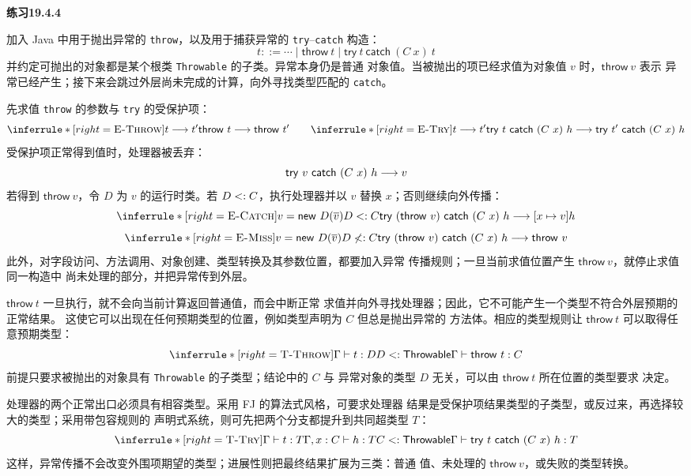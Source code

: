 \begin{taplsolutionentrybox}
\label{sol:translator:19.4.4}
\textbf{练习19.4.4}

加入 Java 中用于抛出异常的 \texttt{throw}，以及用于捕获异常的
\texttt{try}--\texttt{catch} 构造：
\[
 t::=\cdots
 \mid \mathsf{throw}\ t
 \mid \mathsf{try}\ t\ \mathsf{catch}\ (C\ x)\ t
\]
并约定可抛出的对象都是某个根类 \texttt{Throwable} 的子类。异常本身仍是普通
对象值。当被抛出的项已经求值为对象值 \(v\) 时，\(\mathsf{throw}\ v\) 表示
异常已经产生；接下来会跳过外层尚未完成的计算，向外寻找类型匹配的
\texttt{catch}。

先求值 \texttt{throw} 的参数与 \texttt{try} 的受保护项：
\[
\inferrule*[right=\textsc{E-Throw}]
 {t\trans t'}{\mathsf{throw}\ t\trans\mathsf{throw}\ t'}
\qquad
\inferrule*[right=\textsc{E-Try}]
 {t\trans t'}
 {\mathsf{try}\ t\ \mathsf{catch}\ (C\ x)\ h
  \trans
  \mathsf{try}\ t'\ \mathsf{catch}\ (C\ x)\ h}
\]
受保护项正常得到值时，处理器被丢弃：
\[
 \mathsf{try}\ v\ \mathsf{catch}\ (C\ x)\ h\mathrel{\longrightarrow} v
\]
若得到 \(\mathsf{throw}\ v\)，令 \(D\) 为 \(v\) 的运行时类。若
\(D\mathrel{<:} C\)，执行处理器并以 \(v\) 替换 \(x\)；否则继续向外传播：
\[
\inferrule*[right=\textsc{E-Catch}]
 {v=\mathsf{new}\ D(\overline v)\\D\subtype C}
 {\mathsf{try}\ (\mathsf{throw}\ v)\ \mathsf{catch}\ (C\ x)\ h
  \trans[x\mapsto v]h}
\]
\[
\inferrule*[right=\textsc{E-Miss}]
 {v=\mathsf{new}\ D(\overline v)\\D\nsubtype C}
 {\mathsf{try}\ (\mathsf{throw}\ v)\ \mathsf{catch}\ (C\ x)\ h
  \trans\mathsf{throw}\ v}
\]
此外，对字段访问、方法调用、对象创建、类型转换及其参数位置，都要加入异常
传播规则；一旦当前求值位置产生 \(\mathsf{throw}\ v\)，就停止求值同一构造中
尚未处理的部分，并把异常传到外层。

\(\mathsf{throw}\ t\) 一旦执行，就不会向当前计算返回普通值，而会中断正常
求值并向外寻找处理器；因此，它不可能产生一个类型不符合外层预期的正常结果。
这使它可以出现在任何预期类型的位置，例如类型声明为 \(C\) 但总是抛出异常的
方法体。相应的类型规则让 \(\mathsf{throw}\ t\) 可以取得任意预期类型：
\[
\inferrule*[right=\textsc{T-Throw}]
 {\Gamma\vdash t:D\\D\subtype\mathsf{Throwable}}
 {\Gamma\vdash\mathsf{throw}\ t:C}
\]
前提只要求被抛出的对象具有 \texttt{Throwable} 的子类型；结论中的 \(C\) 与
异常对象的类型 \(D\) 无关，可以由 \(\mathsf{throw}\ t\) 所在位置的类型要求
决定。

处理器的两个正常出口必须具有相容类型。采用 FJ 的算法式风格，可要求处理器
结果是受保护项结果类型的子类型，或反过来，再选择较大的类型；采用带包容规则的
声明式系统，则可先把两个分支都提升到共同超类型 \(T\)：
\[
\inferrule*[right=\textsc{T-Try}]
 {\Gamma\vdash t:T\\
  \Gamma,x:C\vdash h:T\\
  C\subtype\mathsf{Throwable}}
 {\Gamma\vdash
  \mathsf{try}\ t\ \mathsf{catch}\ (C\ x)\ h:T}
\]
这样，异常传播不会改变外围项期望的类型；进展性则把最终结果扩展为三类：普通
值、未处理的 \(\mathsf{throw}\ v\)，或失败的类型转换。

\end{taplsolutionentrybox}

